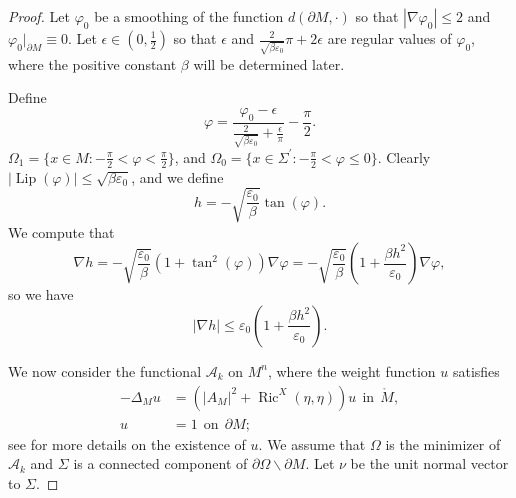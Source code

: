 \documentclass[11pt,letterpaper]{amsart}
\DeclareMathOperator{\Ric}{Ric}
\DeclareMathOperator{\Lip}{Lip}
\newcommand{\mA}{\mathcal{A}}
\theoremstyle{definition}
\theoremstyle{remark}
\numberwithin{equation}{section}
\begin{document}
\begin{proof}
Let $\varphi_0$ be a smoothing of the function $d(\partial M, \cdot)$ so that $|\nabla \varphi_0|\leqslant 2$ and $\varphi_0\big|_{\partial M}\equiv 0$. Let $\epsilon\in (0,\frac{1}{2})$ so that $\epsilon$ and $\frac{2}{\sqrt{\beta\varepsilon_0}}\pi+2\epsilon$ are regular values of $\varphi_0$, where the positive constant $\beta$ will be determined later.

Define
\begin{equation*}
    \varphi=\frac{\varphi_0-\epsilon}{\frac{2}{\sqrt{\beta\varepsilon_0}}+\frac{\epsilon}{\pi}}-\frac{\pi}{2}.
\end{equation*}
$\Omega_1=\{x\in M:-\frac{\pi}{2}<\varphi<\frac{\pi}{2}\}$, and $\Omega_0=\{x\in \Sigma^{'}:-\frac{\pi}{2}<\varphi \leqslant 0\}$. Clearly $|\Lip(\varphi)|\leqslant \sqrt{\beta\varepsilon_0}$, and we define
\begin{equation*}
    h=-\sqrt{\frac{\varepsilon_0}{\beta}}\tan (\varphi).
\end{equation*}
We compute that
\begin{equation*}
    \nabla h=-\sqrt{\frac{\varepsilon_0}{\beta}}\left(1+\tan^2(\varphi)\right)\nabla \varphi=-\sqrt{\frac{\varepsilon_0}{\beta}}\left(1+\frac{\beta h^2}{\varepsilon_0}\right)\nabla \varphi,
\end{equation*}
so we have
\begin{equation*}
    |\nabla h|\leqslant \varepsilon_0\left(1+\frac{\beta h^2}{\varepsilon_0}\right).
\end{equation*}

We now consider the functional $\mA_{k}$ on $M^{n}$, where the weight function $u$ satisfies
 \begin{equation*}
 \begin{split}
     -\Delta_{M}u&=\left(|A_{M}|^2+\Ric^X(\eta, \eta)\right)u ~~\mbox{in}~~ \mathring{M},\\
     u&=1 ~~\mbox{on}~~ \partial M;
     \end{split}
 \end{equation*}
 see \cite{Wu23,chen-hong-li-docarmoquestion} for more details on the existence of $u$.
We assume that $\Omega$ is the minimizer of $\mA_{k}$ and $\Sigma$ is a connected component of $\partial \Omega\backslash \partial M$. Let $\nu$ be the unit normal vector to $\Sigma$. 



\end{proof}
\end{document}

